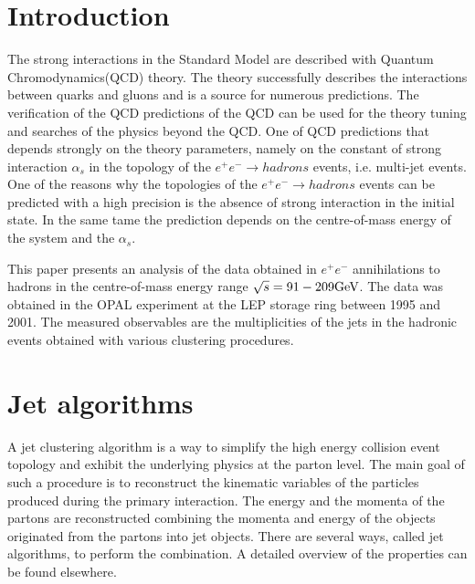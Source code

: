 \newpage
\section{Introduction}
\label{sec:introduction}
The strong interactions  in the Standard Model are described 
with Quantum Chromodynamics(QCD) theory. 
The theory successfully describes 
the interactions between quarks and gluons and is a source for numerous 
predictions. The verification of the QCD predictions of the QCD can
be used for the theory tuning and searches of the physics beyond the 
QCD.
One of QCD predictions that depends strongly on the theory parameters, namely on the constant of strong interaction $\alpha_s$ 
in the topology of the $e^+e^-\rightarrow hadrons$ events, i.e. multi-jet events. One of the reasons why the
topologies of the $e^+e^-\rightarrow hadrons$ events can be predicted with a high
precision is the absence of  strong interaction in the initial state. In the same tame the prediction depends on the 
centre-of-mass energy of the system and the $\alpha_s$.




This paper presents an analysis of the data obtained in $e^+e^-$ 
annihilations to hadrons in the centre-of-mass energy range 
$\sqrt{s}=91-209{\text{Ge}\kern-0.06667em\text{V\/}}$. The data was obtained in the OPAL experiment 
at the LEP storage ring between 1995 and  2001. 
The measured observables are the multiplicities of the jets in the 
hadronic events obtained with various clustering procedures.


\section{Jet algorithms}
\label{sec:algorithms}
A jet clustering algorithm is a way to simplify the high energy collision event topology 
 and exhibit the underlying physics at the parton level. The main goal of such a procedure is to
 reconstruct the kinematic variables of the particles produced during the primary interaction.
 The energy and the momenta of the partons are reconstructed combining the 
 momenta and energy of the objects originated from the partons into jet objects.
 There are several ways, called jet algorithms,
  to perform the combination. A detailed overview of the properties can be found elsewhere.
 
 
 


